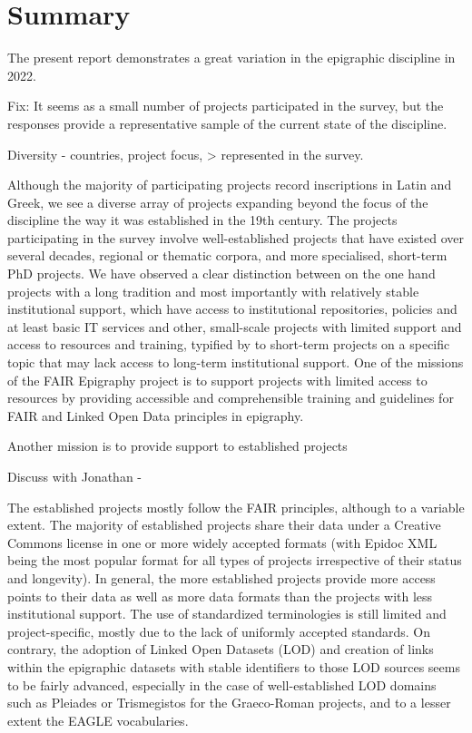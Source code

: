 \documentclass[
  12pt,
]{scrreprt}
\begin{document}
\hypertarget{summary}{%
\chapter{Summary}\label{summary}}

The present report demonstrates a great variation in the epigraphic
discipline in 2022.

Fix: It seems as a small number of projects participated in the survey,
but the responses provide a representative sample of the current state
of the discipline.

Diversity - countries, project focus, \textgreater{} represented in the
survey.

Although the majority of participating projects record inscriptions in
Latin and Greek, we see a diverse array of projects expanding beyond the
focus of the discipline the way it was established in the 19th century.
The projects participating in the survey involve well-established
projects that have existed over several decades, regional or thematic
corpora, and more specialised, short-term PhD projects. We have observed
a clear distinction between on the one hand projects with a long
tradition and most importantly with relatively stable institutional
support, which have access to institutional repositories, policies and
at least basic IT services and other, small-scale projects with limited
support and access to resources and training, typified by to short-term
projects on a specific topic that may lack access to long-term
institutional support. One of the missions of the FAIR Epigraphy project
is to support projects with limited access to resources by providing
accessible and comprehensible training and guidelines for FAIR and
Linked Open Data principles in epigraphy.

Another mission is to provide support to established projects

Discuss with Jonathan -

The established projects mostly follow the FAIR principles, although to
a variable extent. The majority of established projects share their data
under a Creative Commons license in one or more widely accepted formats
(with Epidoc XML being the most popular format for all types of projects
irrespective of their status and longevity). In general, the more
established projects provide more access points to their data as well as
more data formats than the projects with less institutional support. The
use of standardized terminologies is still limited and project-specific,
mostly due to the lack of uniformly accepted standards. On contrary, the
adoption of Linked Open Datasets (LOD) and creation of links within the
epigraphic datasets with stable identifiers to those LOD sources seems
to be fairly advanced, especially in the case of well-established LOD
domains such as Pleiades or Trismegistos for the Graeco-Roman projects,
and to a lesser extent the EAGLE vocabularies.
\end{document}
